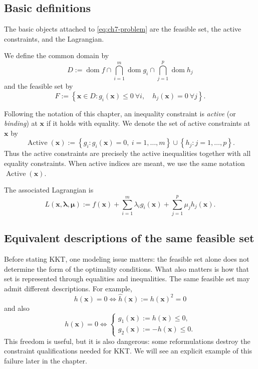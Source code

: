 \subsection{Basic definitions}
The basic objects attached to \eqref{eq:ch7-problem} are the feasible set, the
active constraints, and the Lagrangian.

\begin{definition}
We define the common domain by
\[
  D
  := \operatorname{dom} f
  \cap \bigcap_{i=1}^m \operatorname{dom} g_i
  \cap \bigcap_{j=1}^p \operatorname{dom} h_j
\]
and the feasible set by
\[
  F
  := \left\{\mathbf{x}\in D:
  g_i(\mathbf{x})\le 0 \ \forall i,\quad
  h_j(\mathbf{x})=0 \ \forall j\right\}.
\]
\end{definition}

\begin{definition}
Following the notation of this chapter, an inequality constraint is \emph{active} (or
\emph{binding}) at $\mathbf{x}$ if it holds with equality. We denote the set of
active constraints at $\mathbf{x}$ by
\[
  \operatorname{Active}(\mathbf{x})
  :=
  \left\{g_i : g_i(\mathbf{x})=0,\ i=1,\dots,m\right\}
  \cup
  \left\{h_j : j=1,\dots,p\right\}.
\]
Thus the active constraints are precisely the active inequalities together with
all equality constraints. When active indices are meant, we use the same
notation $\operatorname{Active}(\mathbf{x})$.
\end{definition}

\begin{definition}[Lagrangian]
The associated Lagrangian is
\begin{equation}
  \label{eq:ch7-lagrangian}
  L(\mathbf{x},\boldsymbol{\lambda},\boldsymbol{\mu})
  := f(\mathbf{x})
  + \sum_{i=1}^m \lambda_i g_i(\mathbf{x})
  + \sum_{j=1}^p \mu_j h_j(\mathbf{x}).
\end{equation}
\end{definition}

\subsection{Equivalent descriptions of the same feasible set}
Before stating KKT, one modeling issue matters: the feasible set alone does not
determine the form of the optimality conditions. What also matters is how that
set is represented through equalities and inequalities. The same feasible set
may admit different descriptions. For example,
\[
  h(\mathbf{x}) = 0
  \iff \widehat h(\mathbf{x}) := h(\mathbf{x})^2 = 0
\]
and also
\[
  h(\mathbf{x}) = 0
  \iff
  \begin{cases}
    g_1(\mathbf{x}) := h(\mathbf{x}) \le 0, \\
    g_2(\mathbf{x}) := -h(\mathbf{x}) \le 0.
  \end{cases}
\]
This freedom is useful, but it is also dangerous: some reformulations destroy
the constraint qualifications needed for KKT. We will see an explicit example of
this failure later in the chapter.

